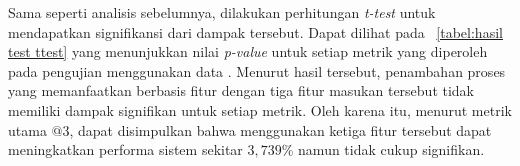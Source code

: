 Sama seperti analisis sebelumnya, dilakukan perhitungan \textit{t-test} untuk mendapatkan signifikansi dari dampak tersebut. Dapat dilihat pada \tabel{}~\ref{tabel:hasil test ttest} yang menunjukkan nilai \textit{p-value} untuk setiap metrik yang diperoleh pada pengujian menggunakan data \testing{}. Menurut hasil tersebut, penambahan proses \reranking{} yang memanfaatkan \reranker{} berbasis fitur dengan tiga fitur masukan tersebut tidak memiliki dampak signifikan untuk setiap metrik. Oleh karena itu, menurut metrik utama \recall{}$@3$, dapat disimpulkan bahwa \reranking{} menggunakan ketiga fitur tersebut dapat meningkatkan performa sistem \ir{} sekitar $3,739\%$ namun tidak cukup signifikan.
\begin{table}[H]
    \centering
    \caption{Hasil \textit{t-test} eksperimen pada data \testing{}}
    \label{tabel:hasil test ttest}
\end{table}





